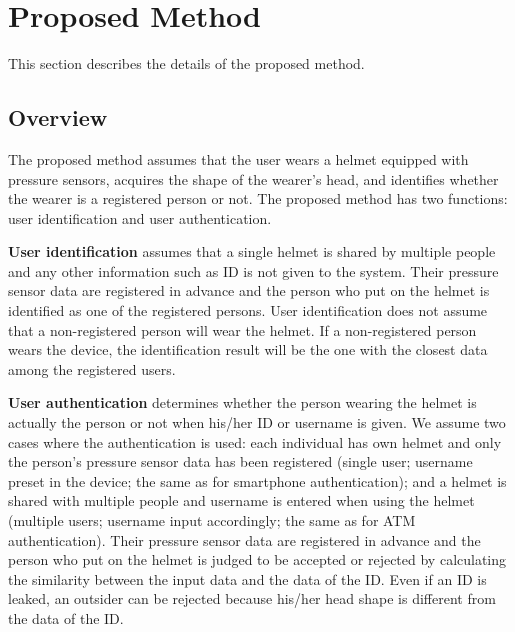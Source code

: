 \documentclass[sigchi,authordraft]{acmart}
\begin{document}

\section{Proposed Method}
\label{sec:method}
This section describes the details of the proposed method.


\subsection{Overview}
The proposed method assumes that the user wears a helmet equipped with pressure sensors, acquires the shape of the wearer's head, and identifies whether the wearer is a registered person or not. The proposed method has two functions: user identification and user authentication.

{\bf User identification} assumes that a single helmet is shared by multiple people and any other information such as ID is not given to the system. Their pressure sensor data are registered in advance and the person who put on the helmet is identified as one of the registered persons. User identification does not assume that a non-registered person will wear the helmet. If a non-registered person wears the device, the identification result will be the one with the closest data among the registered users.
    
{\bf User authentication} determines whether the person wearing the helmet is actually the person or not when his/her ID or username is given. We assume two cases where the authentication is used: each individual has own helmet and only the person's pressure sensor data has been registered (single user; username preset in the device; the same as for smartphone authentication); and a helmet is shared with multiple people and username is entered when using the helmet (multiple users; username input accordingly; the same as for ATM authentication). Their pressure sensor data are registered in advance and the person who put on the helmet is judged to be accepted or rejected by calculating the similarity between the input data and the data of the ID. Even if an ID is leaked, an outsider can be rejected because his/her head shape is different from the data of the ID.
\end{document}

